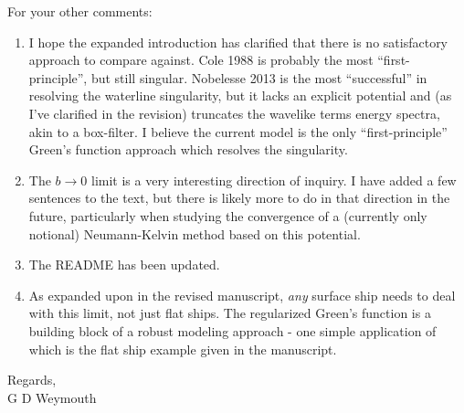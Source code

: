 \documentclass[12pt]{letter}
\begin{document}
For your other comments:
\begin{enumerate}
    \item I hope the expanded introduction has clarified that there is no satisfactory approach to compare against. Cole 1988 is probably the most ``first-principle'', but still singular. Nobelesse 2013 is the most ``successful'' in resolving the waterline singularity, but it lacks an explicit potential and (as I've clarified in the revision) truncates the wavelike terms energy spectra, akin to a box-filter. I believe the current model is the only ``first-principle'' Green's function approach which resolves the singularity. 
    \item The $b\to0$ limit is a very interesting direction of inquiry. I have added a few sentences to the text, but there is likely more to do in that direction in the future, particularly when studying the convergence of a (currently only notional) Neumann-Kelvin method based on this potential.
    \item The README has been updated.
    \item As expanded upon in the revised manuscript, \textit{any} surface ship needs to deal with this limit, not just flat ships. The regularized Green's function is a building block of a robust modeling approach - one simple application of which is the flat ship example given in the manuscript. 
\end{enumerate}

Regards,\\
G D Weymouth
\end{document}
